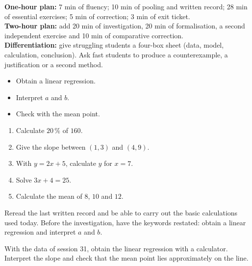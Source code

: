 \ifprof
\begin{methode}
\textbf{One-hour plan:} 7 min of fluency; 10 min of pooling and written record; 28 min of essential exercises; 5 min of correction; 3 min of exit ticket.\\
\textbf{Two-hour plan:} add 20 min of investigation, 20 min of formalisation, a second independent exercise and 10 min of comparative correction.\\
\textbf{Differentiation:} give struggling students a four-box sheet (data, model, calculation, conclusion). Ask fast students to produce a counterexample, a justification or a second method.
\end{methode}
\fi
{}
\begin{objectifs}\begin{itemize}\item Obtain a linear regression.\item Interpret $a$ and $b$.\item Check with the mean point.\end{itemize}\end{objectifs}
\begin{automatismes}\begin{enumerate}\item Calculate $20\,\%$ of $160$. \item Give the slope between $(1,3)$ and $(4,9)$. \item With $y=2x+5$, calculate $y$ for $x=7$. \item Solve $3x+4=25$. \item Calculate the mean of $8$, $10$ and $12$. \end{enumerate}\end{automatismes}
\begin{prerequis}Reread the last written record and be able to carry out the basic calculations used today. Before the investigation, have the keywords restated: obtain a linear regression and interpret $a$ and $b$.\end{prerequis}

\begin{activite}
With the data of session 31, obtain the linear regression with a calculator. Interpret the slope and check that the mean point lies approximately on the line.
\begin{center}\end{center}
\end{activite}

